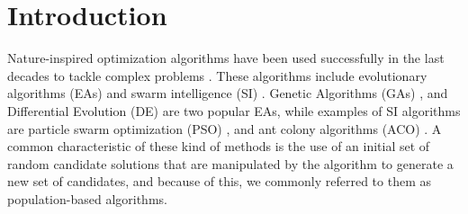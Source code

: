 \section{Introduction}

Nature-inspired optimization algorithms have been used successfully in the last
decades to tackle complex problems \cite{yang2014nature}. These
algorithms include evolutionary algorithms (EAs)
\cite{back1996evolutionary} and swarm intelligence (SI)
\cite{kennedy2006swarm}. %
Genetic Algorithms (GAs) 
\cite{holland1992adaptation,eiben2003genetic}, and
Differential Evolution (DE) \cite{karabouga2004simple} are two popular
EAs, while examples of SI algorithms 
\cite{kennedy2006swarm} are particle swarm optimization (PSO)
\cite{clerc2010particle}, and ant colony algorithms (ACO) \cite{dorigo1999ant}.
A common characteristic of these kind of methods is the
use of an initial set of random candidate solutions that are manipulated by the
algorithm to generate a new set of candidates, and because of this, we commonly
referred to them as population-based algorithms. %

